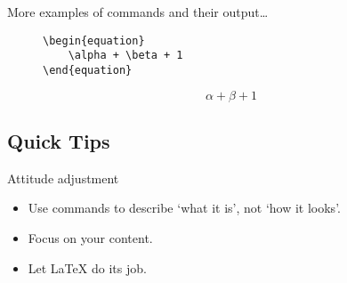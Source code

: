\begin{frame}[fragile]{More examples of commands and their output\ldots}

    \begin{figure}
        \begin{minipage}{0.5\textwidth}
            \begin{lstlisting}
\begin{equation}
    \alpha + \beta + 1
\end{equation}
            \end{lstlisting}
        \end{minipage}
        \begin{minipage}{0.4\textwidth}
            \begin{equation}
                \alpha + \beta + 1
            \end{equation}
        \end{minipage}
    \end{figure}

\end{frame}

\subsection{Quick Tips}

\begin{frame}[fragile]{Attitude adjustment}

    \begin{itemize}
        \item Use commands to describe `what it is', not `how it looks'.
        \item Focus on your content.
        \item Let \LaTeX{} do its job.
    \end{itemize}
\end{frame}



